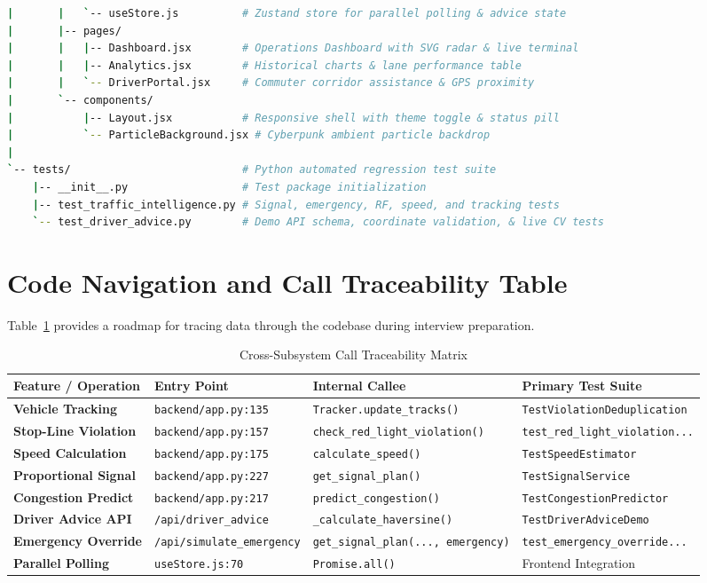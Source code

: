 \documentclass[11pt,a4paper,oneside]{report}
\begin{document}
\begin{lstlisting}[language=bash,caption={Verified Repository Directory Layout}]
|       |   `-- useStore.js          # Zustand store for parallel polling & advice state
|       |-- pages/
|       |   |-- Dashboard.jsx        # Operations Dashboard with SVG radar & live terminal
|       |   |-- Analytics.jsx        # Historical charts & lane performance table
|       |   `-- DriverPortal.jsx     # Commuter corridor assistance & GPS proximity
|       `-- components/
|           |-- Layout.jsx           # Responsive shell with theme toggle & status pill
|           `-- ParticleBackground.jsx # Cyberpunk ambient particle backdrop
|
`-- tests/                           # Python automated regression test suite
    |-- __init__.py                  # Test package initialization
    |-- test_traffic_intelligence.py # Signal, emergency, RF, speed, and tracking tests
    `-- test_driver_advice.py        # Demo API schema, coordinate validation, & live CV tests
\end{lstlisting}

\section{Code Navigation and Call Traceability Table}
Table~\ref{tab:code_nav} provides a roadmap for tracing data through the codebase during interview preparation.

\begin{table}[h!]
\centering
\small
\begin{tabularx}{\textwidth}{p{3.8cm} p{3.2cm} p{3.2cm} X}
\toprule
\textbf{Feature / Operation} & \textbf{Entry Point} & \textbf{Internal Callee} & \textbf{Primary Test Suite} \\
\midrule
\textbf{Vehicle Tracking} & \texttt{backend/app.py:135} & \texttt{Tracker.update\_tracks()} & \texttt{TestViolationDeduplication} \\
\textbf{Stop-Line Violation} & \texttt{backend/app.py:157} & \texttt{check\_red\_light\_violation()} & \texttt{test\_red\_light\_violation...} \\
\textbf{Speed Calculation} & \texttt{backend/app.py:175} & \texttt{calculate\_speed()} & \texttt{TestSpeedEstimator} \\
\textbf{Proportional Signal} & \texttt{backend/app.py:227} & \texttt{get\_signal\_plan()} & \texttt{TestSignalService} \\
\textbf{Congestion Predict} & \texttt{backend/app.py:217} & \texttt{predict\_congestion()} & \texttt{TestCongestionPredictor} \\
\textbf{Driver Advice API} & \texttt{/api/driver\_advice} & \texttt{\_calculate\_haversine()} & \texttt{TestDriverAdviceDemo} \\
\textbf{Emergency Override} & \texttt{/api/simulate\_emergency} & \texttt{get\_signal\_plan(..., emergency)} & \texttt{test\_emergency\_override...} \\
\textbf{Parallel Polling} & \texttt{useStore.js:70} & \texttt{Promise.all()} & Frontend Integration \\
\bottomrule
\end{tabularx}
\caption{Cross-Subsystem Call Traceability Matrix}
\label{tab:code_nav}
\end{table}
\end{document}
